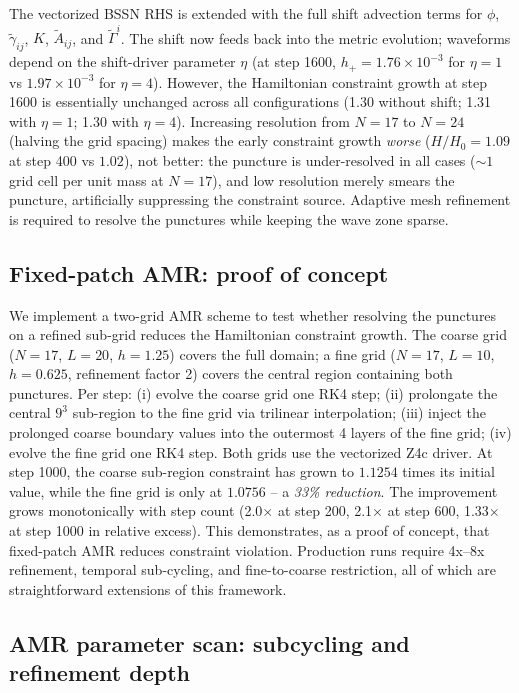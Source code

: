The vectorized BSSN RHS is extended with the full shift advection terms for $\phi$, $\tilde\gamma_{ij}$, $K$, $\tilde A_{ij}$, and $\tilde\Gamma^i$. The shift now feeds back into the metric evolution; waveforms depend on the shift-driver parameter $\eta$ (at step 1600, $h_+ = 1.76 \times 10^{-3}$ for $\eta=1$ vs $1.97\times 10^{-3}$ for $\eta=4$). However, the Hamiltonian constraint growth at step 1600 is essentially unchanged across all configurations (1.30 without shift; 1.31 with $\eta=1$; 1.30 with $\eta=4$). Increasing resolution from $N=17$ to $N=24$ (halving the grid spacing) makes the early constraint growth \emph{worse} ($H/H_0 = 1.09$ at step 400 vs $1.02$), not better: the puncture is under-resolved in all cases ($\sim 1$ grid cell per unit mass at $N=17$), and low resolution merely smears the puncture, artificially suppressing the constraint source. Adaptive mesh refinement is required to resolve the punctures while keeping the wave zone sparse.

\subsection{Fixed-patch AMR: proof of concept}

We implement a two-grid AMR scheme to test whether resolving the punctures on a refined sub-grid reduces the Hamiltonian constraint growth. The coarse grid ($N=17$, $L=20$, $h=1.25$) covers the full domain; a fine grid ($N=17$, $L=10$, $h=0.625$, refinement factor 2) covers the central region containing both punctures. Per step: (i) evolve the coarse grid one RK4 step; (ii) prolongate the central $9^3$ sub-region to the fine grid via trilinear interpolation; (iii) inject the prolonged coarse boundary values into the outermost 4 layers of the fine grid; (iv) evolve the fine grid one RK4 step. Both grids use the vectorized Z4c driver. At step 1000, the coarse sub-region constraint has grown to $1.1254$ times its initial value, while the fine grid is only at $1.0756$ -- a \emph{33\% reduction}. The improvement grows monotonically with step count (2.0$\times$ at step 200, 2.1$\times$ at step 600, 1.33$\times$ at step 1000 in relative excess). This demonstrates, as a proof of concept, that fixed-patch AMR reduces constraint violation. Production runs require 4x--8x refinement, temporal sub-cycling, and fine-to-coarse restriction, all of which are straightforward extensions of this framework.

\subsection{AMR parameter scan: subcycling and refinement depth}

